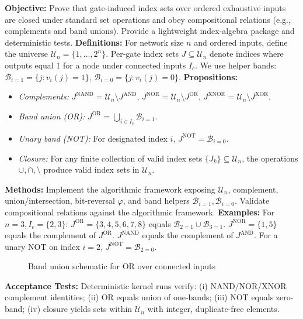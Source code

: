 \textbf{Objective:} Prove that gate-induced index sets over ordered exhaustive inputs are closed under standard set operations and obey compositional relations (e.g., complements and band unions). Provide a lightweight index-algebra package and deterministic tests.
\textbf{Definitions:} For network size \(n\) and ordered inputs, define the universe \(\mathcal{U}_n=\{1,\dots,2^n\}\). Per-gate index sets \(J\subseteq\mathcal{U}_n\) denote indices where outputs equal 1 for a node under connected inputs \(I_c\). We use helper bands: \(\mathcal{B}_{i=1}=\{ j: v_i(j)=1\}\), \(\mathcal{B}_{i=0}=\{ j: v_i(j)=0\}\).
\textbf{Propositions:}
\begin{itemize}
 \item \emph{Complements:} \(J^{\mathrm{NAND}} = \mathcal{U}_n \setminus J^{\mathrm{AND}}\), \(J^{\mathrm{NOR}} = \mathcal{U}_n \setminus J^{\mathrm{OR}}\), \(J^{\mathrm{XNOR}} = \mathcal{U}_n \setminus J^{\mathrm{XOR}}\).
 \item \emph{Band union (OR):} \(J^{\mathrm{OR}} = \bigcup_{i\in I_c} \mathcal{B}_{i=1}\).
 \item \emph{Unary band (NOT):} For designated index \(i\), \(J^{\mathrm{NOT}} = \mathcal{B}_{i=0}\).
 \item \emph{Closure:} For any finite collection of valid index sets \(\{J_k\}\subseteq\mathcal{U}_n\), the operations \(\cup,\cap,\setminus\) produce valid index sets in \(\mathcal{U}_n\).
\end{itemize}
\textbf{Methods:} Implement the algorithmic framework exposing \(\mathcal{U}_n\), complement, union/intersection, bit-reversal \(\varphi\), and band helpers \(\mathcal{B}_{i=1}, \mathcal{B}_{i=0}\). Validate compositional relations against the algorithmic framework.
\textbf{Examples:} For \(n=3, I_c=\{2,3\}\): \(J^{\mathrm{OR}}=\{3,4,5,6,7,8\}\) equals \(\mathcal{B}_{2=1}\cup\mathcal{B}_{3=1}\). \(J^{\mathrm{NOR}}=\{1,5\}\) equals the complement of \(J^{\mathrm{OR}}\). \(J^{\mathrm{NAND}}\) equals the complement of \(J^{\mathrm{AND}}\). For a unary NOT on index \(i=2\), \(J^{\mathrm{NOT}}=\mathcal{B}_{2=0}\).
\begin{figure}[h]
\centering
{}
\caption{Band union schematic for OR over connected inputs}
\end{figure}
\textbf{Acceptance Tests:} Deterministic kernel runs verify: (i) NAND/NOR/XNOR complement identities; (ii) OR equals union of one-bands; (iii) NOT equals zero-band; (iv) closure yields sets within \(\mathcal{U}_n\) with integer, duplicate-free elements.
